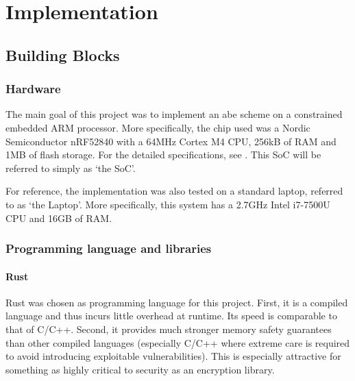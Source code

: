 \chapter{Implementation}

\section{Building Blocks} %

\subsection{Hardware}

The main goal of this project was to implement an \acrshort{abe} scheme on a constrained embedded ARM processor.
More specifically, the chip used was a Nordic Semiconductor nRF52840 with a 64MHz Cortex M4 CPU, 256kB of RAM and 1MB of flash storage.
For the detailed specifications, see \cite{noauthor_nrf52840_nodate}.
This SoC will be referred to simply as `the SoC'.

For reference, the implementation was also tested on a standard laptop, referred to as `the Laptop'.
More specifically, this system has a 2.7GHz Intel i7-7500U CPU and 16GB of RAM.


\subsection{Programming language and libraries}

\subsubsection{Rust}

Rust was chosen as programming language for this project.
First, it is a compiled language and thus incurs little overhead at runtime. Its speed is comparable to that of C/C++. %
Second, it provides much stronger memory safety guarantees than other compiled languages (especially C/C++ where extreme care is required to avoid introducing exploitable vulnerabilities).
This is especially attractive for something as highly critical to security as an encryption library.

